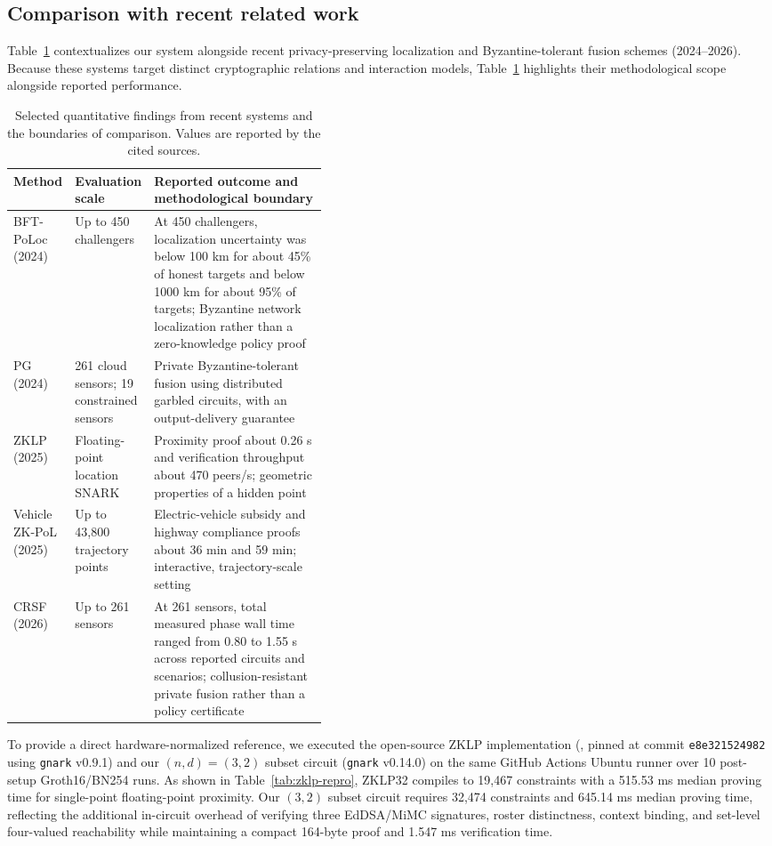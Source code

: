 \documentclass[pdflatex,iicol,sn-mathphys-num]{sn-jnl}
\theoremstyle{thmstyleone}
\begin{document}
\subsection{Comparison with recent related work}
Table~\ref{tab:recent-context} contextualizes our system alongside recent privacy-preserving localization and Byzantine-tolerant fusion schemes (2024--2026). Because these systems target distinct cryptographic relations and interaction models, Table~\ref{tab:recent-context} highlights their methodological scope alongside reported performance.



\begin{table}[t]\centering\footnotesize
\caption{Selected quantitative findings from recent systems and the boundaries of comparison. Values are reported by the cited sources.}\label{tab:recent-context}
\begin{tabularx}{\linewidth}{@{}p{0.17\linewidth}p{0.24\linewidth}X@{}}\toprule
Method&Evaluation scale&Reported outcome and methodological boundary\\\midrule
BFT-PoLoc (2024)~\citep{BFTPoLoc}&Up to 450 challengers&At 450 challengers, localization uncertainty was below 100 km for about 45\% of honest targets and below 1000 km for about 95\% of targets; Byzantine network localization rather than a zero-knowledge policy proof\\
PG (2024)~\citep{PG}&261 cloud sensors; 19 constrained sensors&Private Byzantine-tolerant fusion using distributed garbled circuits, with an output-delivery guarantee\\
ZKLP (2025)~\citep{ZKLP}&Floating-point location SNARK&Proximity proof about 0.26 s and verification throughput about 470 peers/s; geometric properties of a hidden point\\
Vehicle ZK-PoL (2025)~\citep{VehiclePolicy}&Up to 43,800 trajectory points&Electric-vehicle subsidy and highway compliance proofs about 36 min and 59 min; interactive, trajectory-scale setting\\
CRSF (2026)~\citep{CRSF}&Up to 261 sensors&At 261 sensors, total measured phase wall time ranged from 0.80 to 1.55 s across reported circuits and scenarios; collusion-resistant private fusion rather than a policy certificate\\\bottomrule
\end{tabularx}
\end{table}

To provide a direct hardware-normalized reference, we executed the open-source ZKLP implementation (\citet{ZKLP}, pinned at commit \texttt{e8e321524982} using \texttt{gnark} v0.9.1) and our $(n, d) = (3, 2)$ subset circuit (\texttt{gnark} v0.14.0) on the same GitHub Actions Ubuntu runner over 10 post-setup Groth16/BN254 runs. As shown in Table~\ref{tab:zklp-repro}, ZKLP32 compiles to 19,467 constraints with a 515.53 ms median proving time for single-point floating-point proximity. Our $(3, 2)$ subset circuit requires 32,474 constraints and 645.14 ms median proving time, reflecting the additional in-circuit overhead of verifying three EdDSA/MiMC signatures, roster distinctness, context binding, and set-level four-valued reachability while maintaining a compact 164-byte proof and 1.547 ms verification time.
\end{document}
